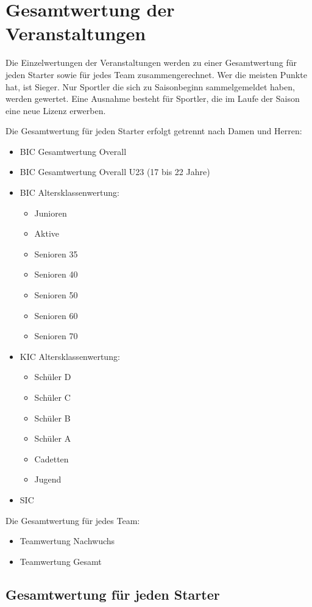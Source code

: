 \section{Gesamtwertung der Veranstaltungen}
Die Einzelwertungen der Veranstaltungen werden zu einer Gesamtwertung für jeden Starter sowie für jedes Team zusammengerechnet. Wer die meisten Punkte hat, ist Sieger. Nur Sportler die sich zu Saisonbeginn sammelgemeldet haben, werden gewertet. Eine Ausnahme besteht für Sportler, die im Laufe der Saison eine neue Lizenz erwerben.

Die Gesamtwertung für jeden Starter erfolgt getrennt nach Damen und Herren:
\begin{itemize}
	\item BIC Gesamtwertung Overall
	\item BIC Gesamtwertung Overall U23 (17 bis 22 Jahre)
	\item BIC Altersklassenwertung:
	\begin{itemize}
		\item Junioren
		\item Aktive
		\item Senioren 35
		\item Senioren 40
		\item Senioren 50
		\item Senioren 60
		\item Senioren 70
	\end{itemize}
	\item KIC Altersklassenwertung:
	\begin{itemize}
		\item Schüler D
		\item Schüler C
		\item Schüler B
		\item Schüler A
		\item Cadetten
		\item Jugend
	\end{itemize}
	\item SIC
\end{itemize}

Die Gesamtwertung für jedes Team:
\begin{itemize}
	\item Teamwertung Nachwuchs
	\item Teamwertung Gesamt
\end{itemize}

\subsection{Gesamtwertung für jeden Starter}

